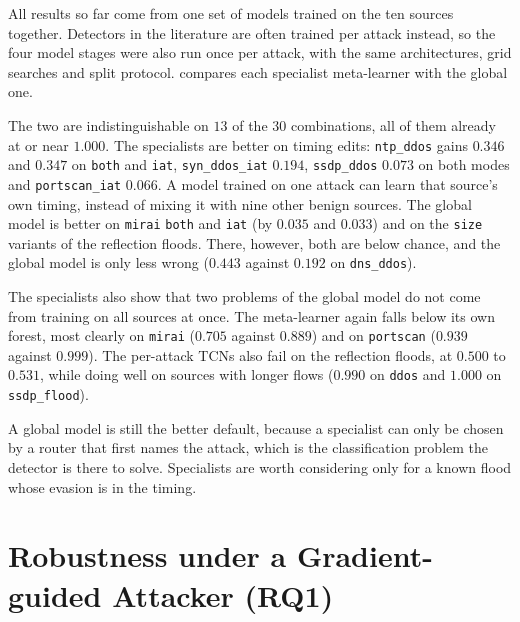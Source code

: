 All results so far come from one set of models trained on the ten sources together.
Detectors in the literature are often trained per attack instead, so the four model
stages were also run once per attack, with the same architectures, grid searches and
split protocol.  compares each specialist meta-learner with the
global one.

The two are indistinguishable on $13$ of the $30$ combinations, all of them already at
or near $1.000$. The specialists are better on timing edits: \texttt{ntp\_ddos} gains
$0.346$ and $0.347$ on \texttt{both} and \texttt{iat}, \texttt{syn\_ddos\_iat} $0.194$,
\texttt{ssdp\_ddos} $0.073$ on both modes and \texttt{portscan\_iat} $0.066$. A model
trained on one attack can learn that source's own timing, instead of mixing it with
nine other benign sources. The global model is better on \texttt{mirai} \texttt{both}
and \texttt{iat} (by $0.035$ and $0.033$) and on the \texttt{size} variants of the
reflection floods. There, however, both are below chance, and the global model is only
less wrong ($0.443$ against $0.192$ on \texttt{dns\_ddos}).

The specialists also show that two problems of the global model do not come from
training on all sources at once. The meta-learner again falls below its own forest, most
clearly on \texttt{mirai} ($0.705$ against $0.889$) and on \texttt{portscan} ($0.939$
against $0.999$). The per-attack TCNs also fail on the reflection floods, at $0.500$ to
$0.531$, while doing well on sources with longer flows ($0.990$ on \texttt{ddos} and
$1.000$ on \texttt{ssdp\_flood}).

A global model is still the better default, because a specialist can only be chosen by
a router that first names the attack, which is the classification problem the detector
is there to solve. Specialists are worth considering only for a known flood whose
evasion is in the timing.

\section{Robustness under a Gradient-guided Attacker (RQ1)}\label{sec:eval-gradablation}


